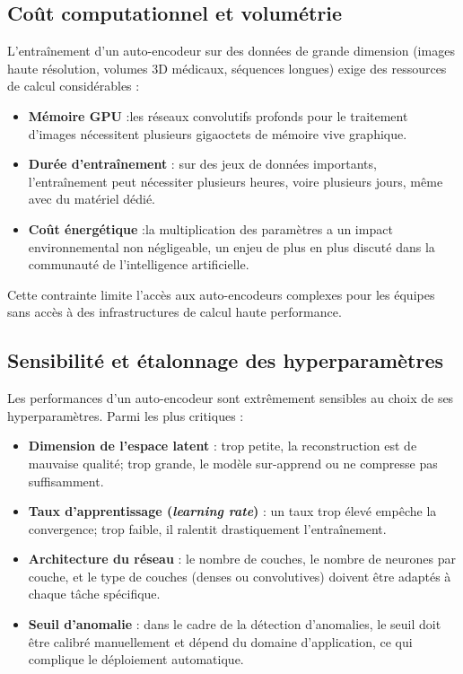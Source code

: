 \documentclass[11pt,a4paper]{report}
\begin{document}
\subsection{Coût computationnel et volumétrie}

L’entraînement d’un auto-encodeur sur des données de grande dimension (images haute résolution, volumes 3D médicaux, séquences longues) exige des ressources de calcul considérables :
 \begin{itemize}
     \item \textbf{Mémoire GPU} :les réseaux convolutifs profonds pour le traitement d’images nécessitent plusieurs gigaoctets de mémoire vive graphique.  
     \item \textbf{Durée d’entraînement} : sur des jeux de données importants, l’entraînement peut nécessiter plusieurs heures, voire plusieurs jours, même avec du matériel dédié.
     \item \textbf{Coût énergétique} :la multiplication des paramètres a un impact environnemental non négligeable, un enjeu de plus en plus discuté dans la communauté de l’intelligence artificielle.
 \end{itemize}
 Cette contrainte limite l’accès aux auto-encodeurs complexes pour les équipes sans accès à des infrastructures de calcul haute performance. 

\subsection{Sensibilité et étalonnage des hyperparamètres}

Les performances d’un auto-encodeur sont extrêmement sensibles au choix de ses hyperparamètres. 
Parmi les plus critiques :
\begin{itemize}
    \item \textbf{Dimension de l’espace latent} : trop petite, la reconstruction est de mauvaise qualité; trop grande, le modèle sur-apprend ou ne compresse pas suffisamment.
    \item \textbf{Taux d’apprentissage (\textit{learning rate})} : un taux trop élevé empêche la convergence; trop faible, il ralentit drastiquement l’entraînement. 
    \item \textbf{Architecture du réseau }: le nombre de couches, le nombre de neurones par couche, et le type de couches (denses ou convolutives) doivent être adaptés à chaque tâche spécifique.
    \item \textbf{Seuil d’anomalie } : dans le cadre de la détection d’anomalies, le seuil doit être calibré manuellement et dépend du domaine d’application, ce qui complique le déploiement automatique.
\end{itemize}
\end{document}
